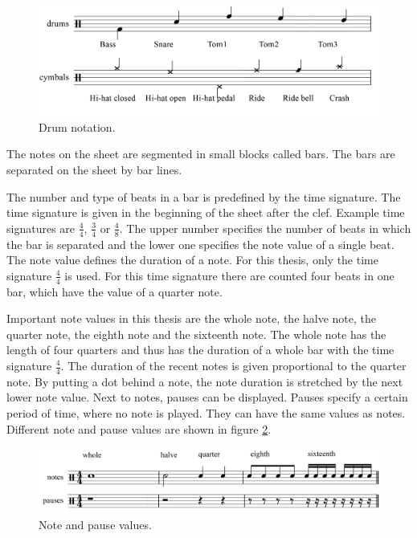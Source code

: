 \begin{figure}[h]
	\centering
	\includegraphics[width=\textwidth]{images/drumsandsheets/notation.png}
	\caption{Drum notation.}
	\label{fig:sheetNotation}
\end{figure}

The notes on the sheet are segmented in small blocks called bars. The bars are separated on the sheet by bar lines.

The number and type of beats in a bar is predefined by the time signature. The time signature is given in the beginning of the sheet after the clef. Example time signatures are $\frac44$, $\frac34$ or $\frac48$. The upper number specifies the number of beats in which the bar is separated and the lower one specifies the note value of a single beat. The note value defines the duration of a note. For this thesis, only the time signature $\frac44$ is used. For this time signature there are counted four beats in one bar, which have the value of a quarter note. 

Important note values in this thesis are the whole note, the halve note, the quarter note, the eighth note and the sixteenth note. The whole note has the length of four quarters and thus has the duration of a whole bar with the time signature $\frac44$. The duration of the recent notes is given proportional to the quarter note. By putting a dot behind a note, the note duration is stretched by the next lower note value. Next to notes, pauses can be displayed. Pauses specify a certain period of time, where no note is played. They can have the same values as notes. Different note and pause values are shown in figure \ref{fig:sheetValues}.

\begin{figure}[h]
	\centering
	\includegraphics[width=\textwidth]{images/drumsandsheets/note_values.png}
	\caption{Note and pause values.}
	\label{fig:sheetValues}
\end{figure}

